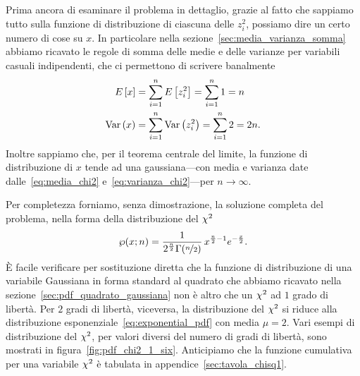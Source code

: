 Prima ancora di esaminare il problema in dettaglio, grazie al fatto che
sappiamo tutto sulla funzione di distribuzione di ciascuna delle $z_i^2$,
possiamo dire un certo numero di cose su $x$. In particolare nella
sezione~\ref{sec:media_varianza_somma} abbiamo ricavato le regole di somma
delle medie e delle varianze per variabili casuali indipendenti, che ci
permettono di scrivere banalmente
\begin{align}
  \label{eq:media_chi2}
  \displaystyle E\left[x\right] & = \sum_{i = 1}^n \displaystyle E\left[z_i^2\right] = \sum_{i = 1}^n 1 = n\\
  \label{eq:varianza_chi2}
  \text{Var}\left(x\right) & = \sum_{i = 1}^n \text{Var}\left(z_i^2\right) = \sum_{i = 1}^n 2 = 2n.
\end{align}
Inoltre sappiamo che, per il teorema centrale del limite, la funzione di
distribuzione di $x$ tende ad una gaussiana---con media e varianza date
dalle~\eqref{eq:media_chi2} e~\eqref{eq:varianza_chi2}---per
$n \rightarrow \infty$.



Per completezza forniamo, senza dimostrazione, la soluzione completa del
problema, nella forma della distribuzione del $\chi^2$
\begin{align}\label{eq:pdf_chi2}
  \chisquarepdf[n]{x} =
  \frac{1}{2^\frac{n}{2}\Gamma(\nicefrac{n}{2})}\, x^{\frac{n}{2} - 1} e^{-\frac{x}{2}}.
\end{align}
\`E facile verificare per sostituzione diretta che la funzione di distribuzione
di una variabile Gaussiana in forma standard al quadrato che abbiamo ricavato
nella sezione~\ref{sec:pdf_quadrato_gaussiana} non è altro che un $\chi^2$
ad $1$ grado di libertà. Per $2$ gradi di libertà, viceversa, la
distribuzione del $\chi^2$ si riduce alla distribuzione
esponenziale~\eqref{eq:exponential_pdf} con media $\mu = 2$.
Vari esempi di distribuzione del $\chi^2$, per valori diversi del numero di
gradi di libertà, sono mostrati in figura~\ref{fig:pdf_chi2_1_six}.
Anticipiamo che la funzione cumulativa per una variabile $\chi^2$ è
tabulata in appendice~\ref{sec:tavola_chisq1}.



